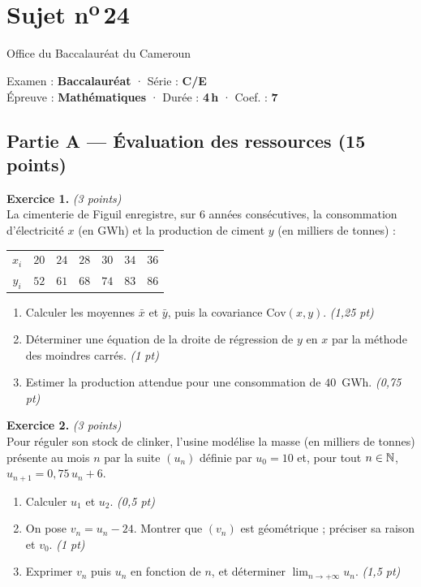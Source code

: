 \section{Sujet n\textsuperscript{o}\,24}
\noindent\begin{minipage}{0.5\linewidth}\footnotesize Office du Baccalauréat du Cameroun\end{minipage}%
\hfill\begin{minipage}{0.45\linewidth}\footnotesize\raggedleft Examen : \textbf{Baccalauréat} · Série : \textbf{C/E}\\
Épreuve : \textbf{Mathématiques} · Durée : \textbf{4\,h} · Coef. : \textbf{7}\end{minipage}
\par\smallskip{\color{onbo}\rule{\linewidth}{1pt}}

\subsection*{Partie A — Évaluation des ressources \hfill (15 points)}

\noindent\textbf{Exercice 1.} \hfill\textit{(3 points)}\\
La cimenterie de Figuil enregistre, sur $6$ années consécutives, la consommation
d'électricité $x$ (en GWh) et la production de ciment $y$ (en milliers de tonnes) :
\begin{center}\small
\begin{tabular}{c|cccccc}
\toprule
$x_i$ & $20$ & $24$ & $28$ & $30$ & $34$ & $36$\\
$y_i$ & $52$ & $61$ & $68$ & $74$ & $83$ & $86$\\
\bottomrule
\end{tabular}
\end{center}
\begin{enumerate}[label=\arabic*)]
\item Calculer les moyennes $\bar x$ et $\bar y$, puis la covariance $\mathrm{Cov}(x,y)$. \hfill\textit{(1,25 pt)}
\item Déterminer une équation de la droite de régression de $y$ en $x$ par la méthode des moindres carrés. \hfill\textit{(1 pt)}
\item Estimer la production attendue pour une consommation de $40$~GWh. \hfill\textit{(0,75 pt)}
\end{enumerate}

\smallskip
\noindent\textbf{Exercice 2.} \hfill\textit{(3 points)}\\
Pour réguler son stock de clinker, l'usine modélise la masse (en milliers de tonnes)
présente au mois $n$ par la suite $(u_n)$ définie par $u_0=10$ et, pour tout $n\in\mathbb{N}$,
$u_{n+1}=0{,}75\,u_n+6$.
\begin{enumerate}[label=\arabic*)]
\item Calculer $u_1$ et $u_2$. \hfill\textit{(0,5 pt)}
\item On pose $v_n=u_n-24$. Montrer que $(v_n)$ est géométrique ; préciser sa raison et $v_0$. \hfill\textit{(1 pt)}
\item Exprimer $v_n$ puis $u_n$ en fonction de $n$, et déterminer $\displaystyle\lim_{n\to+\infty}u_n$. \hfill\textit{(1,5 pt)}
\end{enumerate}

